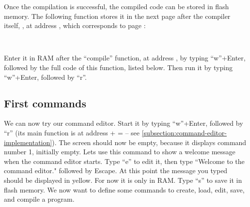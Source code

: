 Once the compilation is successful, the compiled code can be stored in flash
memory. The following function stores it in the next page after the compiler
itself, \ie, at address , which corresponds to
page :

\begin{TwoColumns}
\\
\end{TwoColumns}

Enter it in RAM after the ``compile'' function, at address
, by typing
``w''+Enter, followed by the full
code of this function, listed below. Then run it by typing
``w''+Enter, followed by ``r''.



\subsection{First commands}\label{subsection:first-commands}


We can now try our command editor. Start it by typing
``w''+Enter, followed by ``r'' (its main
function is at address +%
= -- see
\cref{subsection:command-editor-implementation}). The screen should now be
empty, because it displays command number 1, initially empty. Lets use this
command to show a welcome message when the command editor starts. Type ``e'' to
edit it, then type ``Welcome to the command editor." followed by Escape. At
this point the message you typed should be displayed in yellow. For now it is
only in RAM. Type ``s'' to save it in flash memory. We now want to define some
commands to create, load, edit, save, and compile a program.

